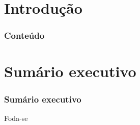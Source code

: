 \section*{Introdução}

\begin{frame}
	\frametitle{Conteúdo}
	\tableofcontents[pausesections]
\end{frame}

\section{Sumário executivo}


\begin{frame}
    \frametitle{Sumário executivo}
Foda-se
\end{frame}


